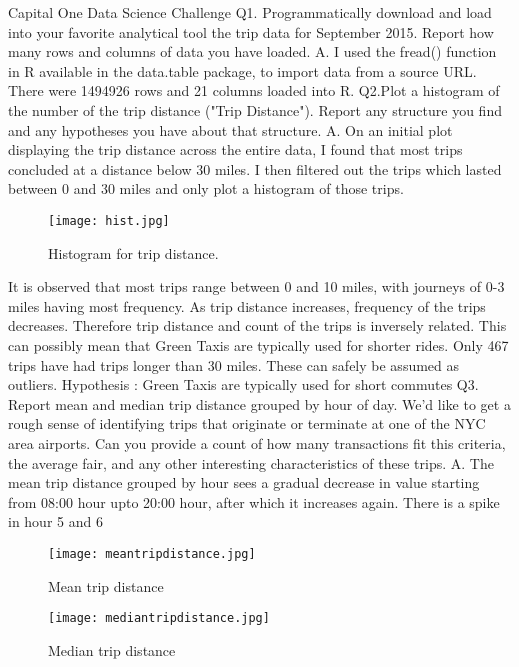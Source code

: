 \documentclass{article}
\begin{document}
\usepackage{graphicx}
Capital One Data Science Challenge \newline
Q1.  Programmatically download and load into your favorite analytical tool the trip data for September 2015. Report how many rows and columns of data you have loaded.\newline
A. I used the fread() function in R available in the data.table package, to import data from a source URL.\newline
There were 1494926 rows and 21 columns loaded into R.\newline
\newline
Q2.Plot a histogram of the number of the trip distance ("Trip Distance"). Report any structure you find and any hypotheses you have about that structure.\newline
A. On an initial plot displaying the trip distance across the entire data, I found that most trips concluded at a distance below 30 miles. I then filtered out the trips which lasted between 0 and 30 miles and only plot a histogram of those trips.\newline
\begin{figure}
  \texttt{[image: hist.jpg]}
  \caption{Histogram for trip distance.}
  \label{fig:Histogram 1}
\end{figure}
\newline
It is observed that most trips range between 0 and 10 miles, with journeys of 0-3 miles having most frequency. As trip distance increases, frequency of the trips decreases. Therefore trip distance and count of the trips is inversely related. This can possibly mean that Green Taxis are typically used for shorter rides.
Only 467 trips have had trips longer than 30 miles. These can safely be assumed as outliers.\newline
Hypothesis : Green Taxis are typically used for short commutes\newline
\newline
Q3. Report mean and median trip distance grouped by hour of day. We'd like to get a rough sense of identifying trips that originate or terminate at one of the NYC area airports. Can you provide a count of how many transactions fit this criteria, the average fair, and any other interesting characteristics of these trips.\newline
A.  The mean trip distance grouped by hour sees a gradual decrease in value starting from 08:00 hour upto 20:00 hour, after which it increases again. There is a spike in hour 5 and 6\newline
\begin{figure}
  \texttt{[image: meantripdistance.jpg]}
  \caption{Mean trip distance}
  \label{fig:Plot 2}
\end{figure} 
\newline
\begin{figure}
  \texttt{[image: mediantripdistance.jpg]}
  \caption{Median trip distance}
  \label{fig:Plot 3}
\end{figure}
\newline
\end{document}
